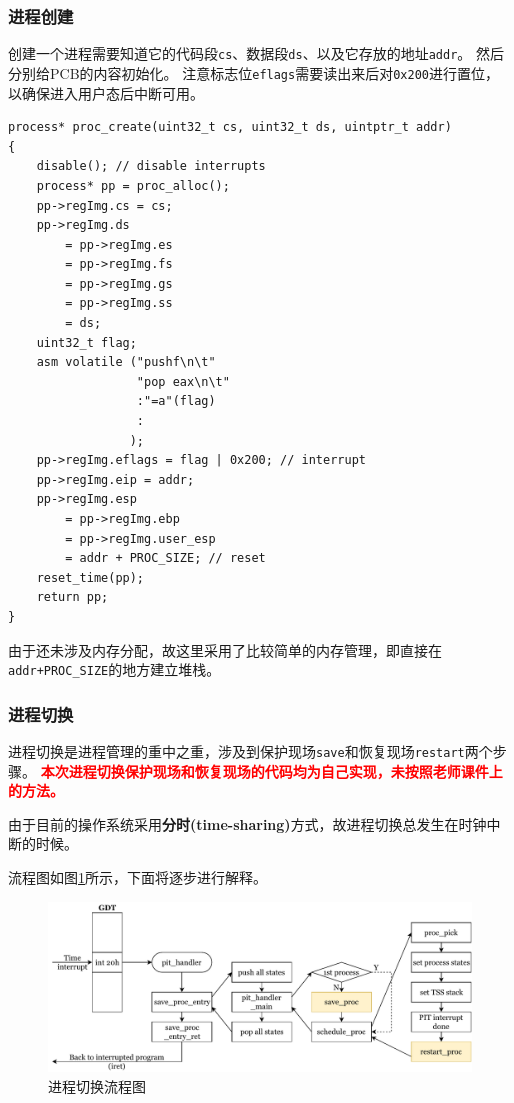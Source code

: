 \documentclass[logo,reportComp]{thesis}
\begin{document}
\subsubsection{进程创建}
创建一个进程需要知道它的代码段\verb'cs'、数据段\verb'ds'、以及它存放的地址\verb'addr'。
然后分别给PCB的内容初始化。
注意标志位\verb'eflags'需要读出来后对\verb'0x200'进行置位，以确保进入用户态后中断可用。
\begin{lstlisting}
process* proc_create(uint32_t cs, uint32_t ds, uintptr_t addr)
{
	disable(); // disable interrupts
	process* pp = proc_alloc();
	pp->regImg.cs = cs;
	pp->regImg.ds
		= pp->regImg.es
		= pp->regImg.fs
		= pp->regImg.gs
		= pp->regImg.ss
		= ds;
	uint32_t flag;
	asm volatile ("pushf\n\t"
				  "pop eax\n\t"
				  :"=a"(flag)
				  :
				 );
	pp->regImg.eflags = flag | 0x200; // interrupt
	pp->regImg.eip = addr;
	pp->regImg.esp
		= pp->regImg.ebp
		= pp->regImg.user_esp
		= addr + PROC_SIZE; // reset
	reset_time(pp);
	return pp;
}
\end{lstlisting}

由于还未涉及内存分配，故这里采用了比较简单的内存管理，即直接在\verb'addr+PROC_SIZE'的地方建立堆栈。

\subsubsection{进程切换}
进程切换是进程管理的重中之重，涉及到保护现场\verb'save'和恢复现场\verb'restart'两个步骤。
\textcolor{red}{\textbf{本次进程切换保护现场和恢复现场的代码均为自己实现，未按照老师课件上的方法。}}

由于目前的操作系统采用\textbf{分时(time-sharing)}方式，故进程切换总发生在时钟中断的时候。

流程图如图\ref{fig:process-management}所示，下面将逐步进行解释。
\begin{figure}[H]
\centering
\includegraphics[width=\linewidth]{fig/process-management.pdf}
\caption{进程切换流程图}
\label{fig:process-management}
\end{figure}
\end{document}
